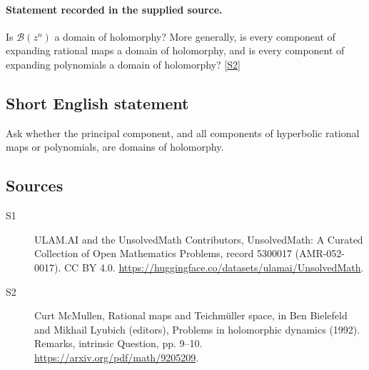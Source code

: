 \documentclass[11pt]{article}
\newcommand{\sref}[2]{\hyperlink{source:#1:#2}{[S#2]}}
\begin{document}
\paragraph{Statement recorded in the supplied source.}
Is $\mathcal B(z^n)$ a domain of holomorphy? More generally, is every component of expanding rational maps a domain of holomorphy, and is every component of expanding polynomials a domain of holomorphy? \sref{5300017}{2}
\subsection{Short English statement}
Ask whether the principal component, and all components of hyperbolic rational maps or polynomials, are domains of holomorphy.
\subsection{Sources}
\begin{description}
\item[\hypertarget{source:5300017:1}{S1}] ULAM.AI and the UnsolvedMath Contributors, UnsolvedMath: A Curated Collection of Open Mathematics Problems, record 5300017 (AMR-052-0017). CC BY 4.0. \url{https://huggingface.co/datasets/ulamai/UnsolvedMath}.
\item[\hypertarget{source:5300017:2}{S2}] Curt McMullen, Rational maps and Teichmüller space, in Ben Bielefeld and Mikhail Lyubich (editors), Problems in holomorphic dynamics (1992). Remarks, intrinsic Question, pp. 9–10. \url{https://arxiv.org/pdf/math/9205209}.
\end{description}
\label{end:5300017}
\end{document}
